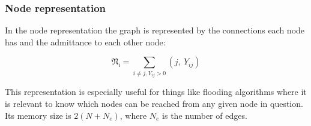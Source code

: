 \subsubsection{Node representation}

In the node representation the graph is represented by the connections
each node has and the admittance to each other node:

\begin{equation}
    \mathfrak{N_i} = \sum_{i \ne j, Y_{ij} > 0} (j, \ Y_{ij})
    \label{eq:graph_theory:node_form}
\end{equation}

This representation is especially useful for things like flooding algorithms where it is
relevant to know which nodes can be reached from any given node in question. Its memory
size is $2(N+N_e)$, where $N_e$ is the number of edges.
